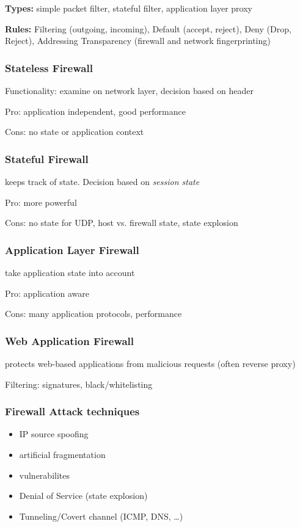 \documentclass[fs, footer]{latex4ei}
\begin{document}
\begin{multicols*}{4}
{\textbf{Types:} simple packet filter, stateful filter, application layer proxy

\textbf{Rules:} Filtering (outgoing, incoming), Default (accept, reject), Deny (Drop, Reject), Addressing Transparency (firewall and network fingerprinting)

\subsubsection{Stateless Firewall}
Functionality: examine on network layer, decision based on header

Pro: application independent, good performance

Cons: no state or application context

\subsubsection{Stateful Firewall}
keeps track of state. Decision based on \emph{session state}

Pro: more powerful

Cons: no state for UDP, host vs. firewall state, state explosion

 \subsubsection{Application Layer Firewall}
 take application state into account

 Pro: application aware

 Cons: many application protocols, performance

 \subsubsection{Web Application Firewall}
protects web-based applications from malicious requests (often reverse proxy)

Filtering: signatures, black/whitelisting

 \subsubsection{Firewall Attack techniques}
 \begin{itemize}
 	\item IP source spoofing
 	\item artificial fragmentation
 	\item vulnerabilites
 	\item Denial of Service (state explosion)
 	\item Tunneling/Covert channel (ICMP, DNS, \ldots)
 \end{itemize}

}
\end{multicols*}
\end{document}
